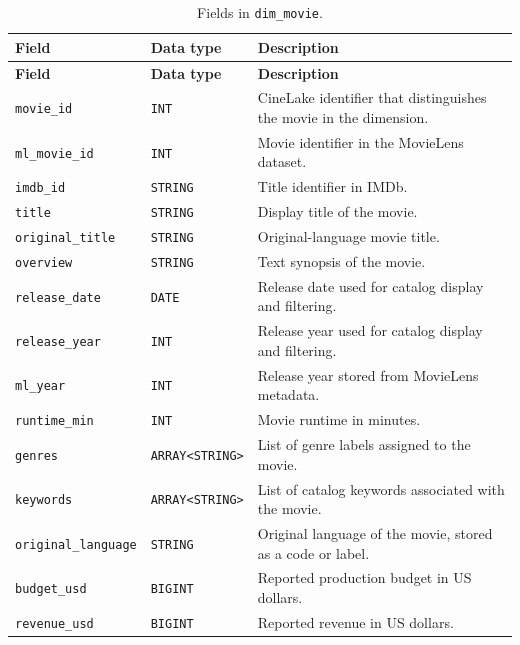 \documentclass[a4paper,12pt]{article}
\newcommand{\dbsep}{\_\allowbreak}
\begin{document}
\begingroup
\small
\setlength{\tabcolsep}{4pt}
\renewcommand{\arraystretch}{1.1}
\begin{longtable}{@{}>{\raggedright\arraybackslash}p{}
                    >{\raggedright\arraybackslash}p{}
                    >{\raggedright\arraybackslash}p{}@{}}
\caption{Fields in \texttt{dim\dbsep movie}.}\\
\toprule
\textbf{Field} & \textbf{Data type} & \textbf{Description}\\
\midrule
\endfirsthead
\toprule
\textbf{Field} & \textbf{Data type} & \textbf{Description}\\
\midrule
\endhead
\bottomrule
\endfoot
\texttt{movie\dbsep id} & \texttt{INT} & CineLake identifier that distinguishes the movie in the dimension.\\
\texttt{ml\dbsep movie\dbsep id} & \texttt{INT} & Movie identifier in the MovieLens dataset.\\
\texttt{imdb\dbsep id} & \texttt{STRING} & Title identifier in IMDb.\\
\texttt{title} & \texttt{STRING} & Display title of the movie.\\
\texttt{original\dbsep title} & \texttt{STRING} & Original-language movie title.\\
\texttt{overview} & \texttt{STRING} & Text synopsis of the movie.\\
\texttt{release\dbsep date} & \texttt{DATE} & Release date used for catalog display and filtering.\\
\texttt{release\dbsep year} & \texttt{INT} & Release year used for catalog display and filtering.\\
\texttt{ml\dbsep year} & \texttt{INT} & Release year stored from MovieLens metadata.\\
\texttt{runtime\dbsep min} & \texttt{INT} & Movie runtime in minutes.\\
\texttt{genres} & \texttt{ARRAY\allowbreak\textless{}STRING\textgreater{}} & List of genre labels assigned to the movie.\\
\texttt{keywords} & \texttt{ARRAY\allowbreak\textless{}STRING\textgreater{}} & List of catalog keywords associated with the movie.\\
\texttt{original\dbsep language} & \texttt{STRING} & Original language of the movie, stored as a code or label.\\
\texttt{budget\dbsep usd} & \texttt{BIGINT} & Reported production budget in US dollars.\\
\texttt{revenue\dbsep usd} & \texttt{BIGINT} & Reported revenue in US dollars.\\

\end{longtable}
\end{document}
